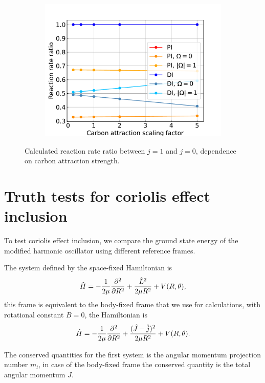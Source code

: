\documentclass{article}
\begin{document}
    \begin{figure}[H]
        \centering
        \begin{subfigure}{.7\linewidth}
            \centering
            \includegraphics[width=\linewidth]{attr_c_scaling_ratio.pdf}
        \end{subfigure} 
        \caption{Calculated reaction rate ratio between $j = 1$ and $j = 0$, dependence on carbon attraction strength.}
    \end{figure}


\section{Truth tests for coriolis effect inclusion}
    To test coriolis effect inclusion, we compare the ground state energy 
    of the modified harmonic oscillator using different reference frames.

    The system defined by the space-fixed Hamiltonian is
    \begin{equation}
        \hat{H} = -\frac{1}{2\mu} \pdv*[order=2]{}{R} + \frac{\hat{L}^2}{2 \mu R^2} + V(R, \theta),
    \end{equation}
    this frame is equivalent to the body-fixed frame that we use for calculations, with rotational constant $B = 0$,
    the Hamiltonian is
    \begin{equation}
        \hat{H} = -\frac{1}{2\mu} \pdv*[order=2]{}{R} + \frac{(\hat{J} - \hat{j})^2}{2 \mu R^2} + V(R, \theta).
    \end{equation}

    The conserved quantities for the first system is the angular momentum projection number $m_l$,
    in case of the body-fixed frame the conserved quantity is the total angular momentum $J$.
\end{document}
